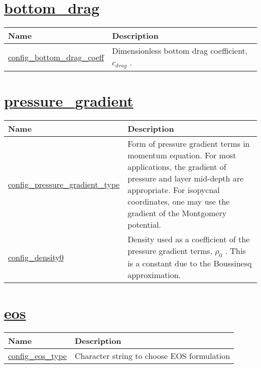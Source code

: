 \section[bottom\_drag]{\hyperref[sec:nm_sec_bottom_drag]{bottom\_drag}}
\label{sec:nm_tab_bottom_drag}

{\small
\begin{center}
\begin{longtable}{| p{2.0in} || p{4.0in} |}
	\hline
	{\bf Name} & {\bf Description} \\
	\hline
	\hline
	\hyperref[subsec:nm_sec_config_bottom_drag_coeff]{config\_bottom\_drag\_coeff} &  Dimensionless bottom drag coefficient,  $c_{drag}$ . \\
	\hline
\end{longtable}
\end{center}
}
\section[pressure\_gradient]{\hyperref[sec:nm_sec_pressure_gradient]{pressure\_gradient}}
\label{sec:nm_tab_pressure_gradient}

{\small
\begin{center}
\begin{longtable}{| p{2.0in} || p{4.0in} |}
	\hline
	{\bf Name} & {\bf Description} \\
	\hline
	\hline
	\hyperref[subsec:nm_sec_config_pressure_gradient_type]{config\_pressure\_gradient\_type} & Form of pressure gradient terms in momentum equation. For most applications, the gradient of pressure and layer mid-depth are appropriate.  For isopycnal coordinates, one may use the gradient of the Montgomery potential. \\
	\hline
	\hyperref[subsec:nm_sec_config_density0]{config\_density0} &  Density used as a coefficient of the pressure gradient terms,  $\rho_0$ .  This is a constant due to the Boussinesq approximation. \\
	\hline
\end{longtable}
\end{center}
}
\section[eos]{\hyperref[sec:nm_sec_eos]{eos}}
\label{sec:nm_tab_eos}

{\small
\begin{center}
\begin{longtable}{| p{2.0in} || p{4.0in} |}
	\hline
	{\bf Name} & {\bf Description} \\
	\hline
	\hline
	\hyperref[subsec:nm_sec_config_eos_type]{config\_eos\_type} & Character string to choose EOS formulation \\
	\hline
\end{longtable}
\end{center}
}
